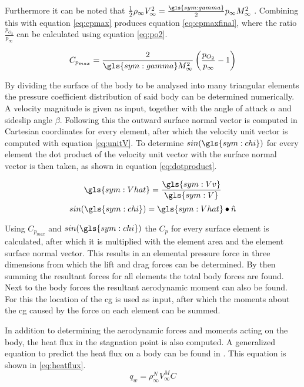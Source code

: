 Furthermore it can be noted that $\frac{1}{2}\rho_{\infty}V_{\infty}^{2}=\frac{\gls{sym:gamma}}{2}p_{\infty}M_{\infty}^{2}$ \cite{AndersonJr.2007}. Combining this with equation \ref{eq:cpmax} produces equation \ref{eq:cpmaxfinal}, where the ratio $\frac{p_{O_{2}}}{p_{\infty}}$ can be calculated using equation \ref{eq:po2}.

\begin{equation}
C_{p_{max}}=\frac{2}{\gls{sym:gamma} M_{\infty}^{2}}\left(\frac{p_{O_{2}}}{p_{\infty}}-1\right)
\label{eq:cpmaxfinal}
\end{equation}

By dividing the surface of the body to be analysed into many triangular elements the pressure coefficient distribution of said body can be determined numerically. A velocity magnitude is given as input, together with the angle of attack $\alpha$ and sideslip angle $\beta$. Following this the outward surface normal vector is computed in Cartesian coordinates for every element, after which the velocity unit vector is computed with equation \ref{eq:unitV}. To determine $sin(\gls{sym:chi})$ for every element the dot product of the velocity unit vector with the surface normal vector is then taken, as shown in equation \ref{eq:dotproduct}.
\begin{multicols}{2}
\begin{equation}
\gls{sym:Vhat}=\frac{\gls{sym:Vv}}{\gls{sym:V}}
\label{eq:unitV}
\end{equation} \break
\begin{equation}
sin(\gls{sym:chi})=\gls{sym:Vhat} \bullet \hat{n}
\label{eq:dotproduct}
\end{equation}
\end{multicols}
Using $C_{p_{max}}$ and $sin(\gls{sym:chi})$ the $C_{p}$ for every surface element is calculated, after which it is multiplied with the element area and the element surface normal vector. This results in an elemental pressure force in three dimensions from which the lift and drag forces can be determined. By then summing the resultant forces for all elements the total body forces are found. Next to the body forces the resultant aerodynamic moment can also be found. For this the location of the \acrfull{cg} is used as input, after which the moments about the \gls{cg} caused by the force on each element can be summed. 

In addition to determining the aerodynamic forces and moments acting on the body, the heat flux in the stagnation point is also computed. A generalized equation to predict the heat flux on a body can be found in \cite{AndersonJr.2006,Tauber1986}. This equation is shown in \ref{eq:heatflux}.
\begin{equation}
q_{w}=\rho_{\infty}^{N}V_{\infty}^{M}C
\label{eq:heatflux}
\end{equation}

